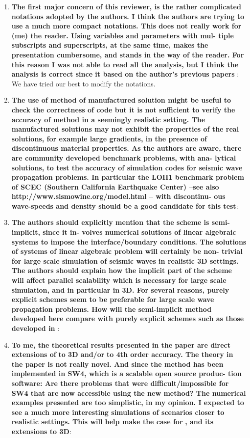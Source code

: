 \documentclass[twoside,11pt]{article}
\begin{document}
\begin{enumerate}
\item \textbf{The first major concern of this reviewer, is the rather complicated notations adopted by the authors. I think the authors are trying to use a much more compact notations. This does not really work for (me) the reader. Using variables and parameters with mul- tiple subscripts and superscripts, at the same time, makes the presentation cumbersome, and stands in the way of the reader. For this reason I was not able to read all the analysis, but I think the analysis is correct since it based on the author’s previous papers} \cite{petersson2009stable,wang2019fourth,petersson2015wave}: We have tried our best to modify the notations.

\item  \textbf{The use of method of manufactured solution might be useful to check the correctness of code but it is not sufficient to verify the accuracy of method in a seemingly realistic setting. The manufactured solutions may not exhibit the properties of the real solutions, for example large gradients, in the presence of discontinuous material properties. As the authors are aware, there are community developed benchmark problems, with ana- lytical solutions, to test the accuracy of simulation codes for seismic wave propagation problems. In particular the LOH1 benchmark problem of SCEC (Southern California Earthquake Center) –see also http://www.sismowine.org/model.html – with discontinu- ous wave-speeds and density should be a good candidate for this test}: 

\item  \textbf{The authors should explicitly mention that the scheme is semi-implicit, since it in- volves numerical solutions of linear algebraic systems to impose the interface/boundary conditions. The solutions of systems of linear algebraic problem will certainly be non- trivial for large scale simulation of seismic waves in realistic 3D settings. The authors should explain how the implicit part of the scheme will affect parallel scalability which is necessary for large scale simulation, and in particular in 3D. For several reasons, purely explicit schemes seem to be preferable for large scale wave propagation problems. How will the semi-implicit method developed here compare with purely explicit schemes such as those developed in} \cite{virta2014acoustic,duru2014stable}: 

\item  \textbf{To me, the theoretical results presented in the paper are direct extensions of} \cite{wang2019fourth} \textbf{to 3D and/or} \cite{petersson2009stable} \textbf{to 4th order accuracy. The theory in the paper is not really novel. And since the method has been implemented in SW4, which is a scalable open source produc- tion software: Are there problems that were difficult/impossible for SW4 that are now accessible using the new method? The numerical examples presented are too simplistic, in my opinion. I expected to see a much more interesting simulations of scenarios closer to realistic settings. This will help make the case for} \cite{wang2019fourth}\textbf{, and its extensions to 3D}: 


\end{enumerate}
\end{document}
